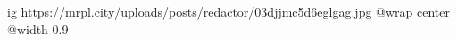  
 
 
 
 

\ifcmt
  ig https://mrpl.city/uploads/posts/redactor/03djjmc5d6eglgag.jpg
  @wrap center
  @width 0.9
\fi
